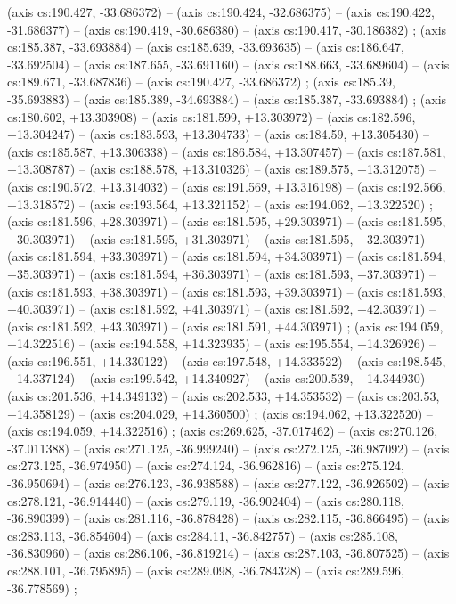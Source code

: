     (axis cs:190.427,    -33.686372) --  (axis cs:190.424,    -32.686375) --  (axis cs:190.422,    -31.686377) --  (axis cs:190.419,    -30.686380) --  (axis cs:190.417,    -30.186382) ;
    (axis cs:185.387,    -33.693884) --  (axis cs:185.639,    -33.693635) --  (axis cs:186.647,    -33.692504) --  (axis cs:187.655,    -33.691160) --  (axis cs:188.663,    -33.689604) --  (axis cs:189.671,    -33.687836) --  (axis cs:190.427,    -33.686372) ;
    (axis cs:185.39,    -35.693883) --  (axis cs:185.389,    -34.693884) --  (axis cs:185.387,    -33.693884) ;
    (axis cs:180.602,    +13.303908) --  (axis cs:181.599,    +13.303972) --  (axis cs:182.596,    +13.304247) --  (axis cs:183.593,    +13.304733) --  (axis cs:184.59,    +13.305430) --  (axis cs:185.587,    +13.306338) --  (axis cs:186.584,    +13.307457) --  (axis cs:187.581,    +13.308787) --  (axis cs:188.578,    +13.310326) --  (axis cs:189.575,    +13.312075) --  (axis cs:190.572,    +13.314032) --  (axis cs:191.569,    +13.316198) --  (axis cs:192.566,    +13.318572) --  (axis cs:193.564,    +13.321152) --  (axis cs:194.062,    +13.322520) ;
    (axis cs:181.596,    +28.303971) --  (axis cs:181.595,    +29.303971) --  (axis cs:181.595,    +30.303971) --  (axis cs:181.595,    +31.303971) --  (axis cs:181.595,    +32.303971) --  (axis cs:181.594,    +33.303971) --  (axis cs:181.594,    +34.303971) --  (axis cs:181.594,    +35.303971) --  (axis cs:181.594,    +36.303971) --  (axis cs:181.593,    +37.303971) --  (axis cs:181.593,    +38.303971) --  (axis cs:181.593,    +39.303971) --  (axis cs:181.593,    +40.303971) --  (axis cs:181.592,    +41.303971) --  (axis cs:181.592,    +42.303971) --  (axis cs:181.592,    +43.303971) --  (axis cs:181.591,    +44.303971) ;
    (axis cs:194.059,    +14.322516) --  (axis cs:194.558,    +14.323935) --  (axis cs:195.554,    +14.326926) --  (axis cs:196.551,    +14.330122) --  (axis cs:197.548,    +14.333522) --  (axis cs:198.545,    +14.337124) --  (axis cs:199.542,    +14.340927) --  (axis cs:200.539,    +14.344930) --  (axis cs:201.536,    +14.349132) --  (axis cs:202.533,    +14.353532) --  (axis cs:203.53,    +14.358129) --  (axis cs:204.029,    +14.360500) ;
    (axis cs:194.062,    +13.322520) --  (axis cs:194.059,    +14.322516) ;
    (axis cs:269.625,    -37.017462) --  (axis cs:270.126,    -37.011388) --  (axis cs:271.125,    -36.999240) --  (axis cs:272.125,    -36.987092) --  (axis cs:273.125,    -36.974950) --  (axis cs:274.124,    -36.962816) --  (axis cs:275.124,    -36.950694) --  (axis cs:276.123,    -36.938588) --  (axis cs:277.122,    -36.926502) --  (axis cs:278.121,    -36.914440) --  (axis cs:279.119,    -36.902404) --  (axis cs:280.118,    -36.890399) --  (axis cs:281.116,    -36.878428) --  (axis cs:282.115,    -36.866495) --  (axis cs:283.113,    -36.854604) --  (axis cs:284.11,    -36.842757) --  (axis cs:285.108,    -36.830960) --  (axis cs:286.106,    -36.819214) --  (axis cs:287.103,    -36.807525) --  (axis cs:288.101,    -36.795895) --  (axis cs:289.098,    -36.784328) --  (axis cs:289.596,    -36.778569) ;
